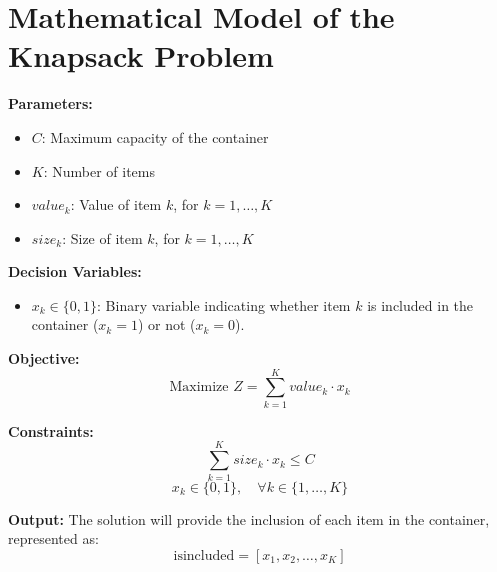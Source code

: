 \documentclass{article}
\begin{document}
\section*{Mathematical Model of the Knapsack Problem}

\textbf{Parameters:}
\begin{itemize}
    \item $C$: Maximum capacity of the container
    \item $K$: Number of items
    \item $value_k$: Value of item $k$, for $k = 1, \ldots, K$
    \item $size_k$: Size of item $k$, for $k = 1, \ldots, K$
\end{itemize}

\textbf{Decision Variables:}
\begin{itemize}
    \item $x_k \in \{0, 1\}$: Binary variable indicating whether item $k$ is included in the container ($x_k = 1$) or not ($x_k = 0$).
\end{itemize}

\textbf{Objective:}
\begin{equation}
    \text{Maximize } Z = \sum_{k=1}^{K} value_k \cdot x_k
\end{equation}

\textbf{Constraints:}
\begin{equation}
    \sum_{k=1}^{K} size_k \cdot x_k \leq C
\end{equation}
\begin{equation}
    x_k \in \{0, 1\}, \quad \forall k \in \{1, \ldots, K\}
\end{equation}

\textbf{Output:}
The solution will provide the inclusion of each item in the container, represented as:
\begin{equation}
    \text{isincluded} = [x_1, x_2, \ldots, x_K]
\end{equation}
\end{document}
